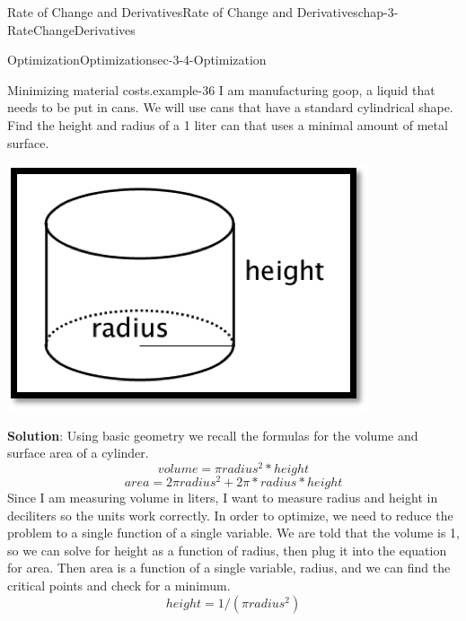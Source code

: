 \documentclass[oneside,10pt,]{book}
\newcommand{\terminology}[1]{\textbf{#1}}
\numberwithin{equation}{section}
\begin{document}
\begin{chapterptx}{Rate of Change and Derivatives}{}{Rate of Change and Derivatives}{}{}{chap-3-RateChangeDerivatives}
\begin{sectionptx}{Optimization}{}{Optimization}{}{}{sec-3-4-Optimization}
\begin{example}{Minimizing material costs.}{example-36}%
\hypertarget{p-1223}{}%
I am manufacturing goop, a liquid that needs to be put in cans.  We will use cans that have a standard cylindrical shape.  Find the height and radius of a 1 liter can that uses a minimal amount of metal surface.%
\begin{sidebyside}{1}{0.25}{0.25}{0}%
\begin{sbspanel}{0.5}%
\includegraphics[width=1\linewidth]{images/sec3-4-7.png}
\end{sbspanel}%
\end{sidebyside}%
\par
\hypertarget{p-1224}{}%
\terminology{Solution}: Using basic geometry we recall the formulas for the volume and surface area of a cylinder.%
%
\begin{equation*}
volume= \pi radius^2*height
\end{equation*}
%
\begin{equation*}
area=2 \pi radius^2+2 \pi*radius*height
\end{equation*}
\hypertarget{p-1225}{}%
Since I am measuring volume in liters, I want to measure radius and height in deciliters so the units work correctly.  In order to optimize, we need to reduce the problem to a single function of a single variable.  We are told that the volume is 1, so we can solve for height as a function of radius, then plug it into the equation for area.  Then area is a function of a single variable, radius, and we can find the critical points and check for a minimum.%
%
\begin{equation*}
height=1/( \pi radius^2)
\end{equation*}

\end{example}
\end{sectionptx}
\end{chapterptx}
\end{document}
